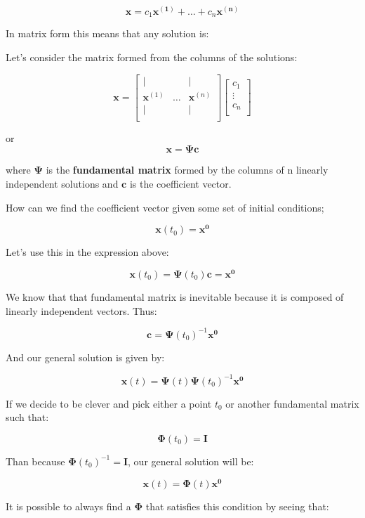 \documentclass{report}
\begin{document}
$$\mathbf{x} = c_1\mathbf{x^{(1)}} + \dots + c_n\mathbf{x^{(n)}}$$

In matrix form this means that any solution is:

Let's consider the matrix formed from the columns of the solutions:


$$
\mathbf{x} =
\begin{bmatrix}
    \vert & & \vert \\
    \mathbf{x}^{(1)} & \dots & \mathbf{x}^{(n)} \\
    \vert & & \vert \\
\end{bmatrix}
\begin{bmatrix}
    c_1 \\
    \vdots \\
    c_n \\
\end{bmatrix}
$$

or 
$$\mathbf{x} = \mathbf{\Psi c}$$

where $\mathbf{\Psi}$ is the \textbf{fundamental matrix} formed by the columns of n linearly independent solutions and $\mathbf{c}$ is the coefficient vector.

How can we find the coefficient vector given some set of initial conditions;

$$\mathbf{x}(t_0) = \mathbf{x^0}$$

Let's use this in the expression above:


$$\mathbf{x}(t_0) = \mathbf{\Psi}(t_0)\mathbf{c} = \mathbf{x^0}$$

We know that that fundamental matrix is inevitable because it is composed of linearly independent vectors. Thus:

$$\mathbf{c} = \mathbf{\Psi}(t_0)^{-1}\mathbf{x^0}$$

And our general solution is given by:

$$\mathbf{x}(t) = \mathbf{\Psi}(t)\mathbf{\Psi}(t_0)^{-1}\mathbf{x^0}$$


If we decide to be clever and pick either a point $t_0$ or another fundamental matrix such that:

$$\mathbf{\Phi}(t_0) = \mathbf{I}$$

Than because $\mathbf{\Phi}(t_0)^{-1} = \mathbf{I}$, our general solution will be:

$$\mathbf{x}(t) = \mathbf{\Phi}(t)\mathbf{x^0}$$

It is possible to always find a $\mathbf{\Phi}$ that satisfies this condition by seeing that:
\end{document}
